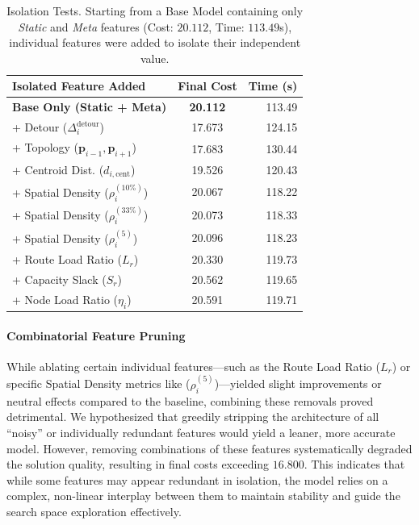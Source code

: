 \documentclass[letterpaper]{article} %
\begin{document}
\begin{table}[h]

\centering

\small

\caption{Isolation Tests. Starting from a Base Model containing only \textit{Static} and \textit{Meta} features (Cost: $20.112$, Time: $113.49$s), individual features were added to isolate their independent value.}
\label{tab:isolation_ablation}
\begin{tabular}{l c r}
\toprule
\textbf{Isolated Feature Added} & \textbf{Final Cost} & \textbf{Time (s)} \\
\midrule
\textbf{Base Only (Static + Meta)} & \textbf{20.112} & 113.49 \\
\midrule
+ Detour ($\Delta^{\text{detour}}_i$) & 17.673 & 124.15 \\
+ Topology ($\mathbf{p}_{i-1}, \mathbf{p}_{i+1}$) & 17.683 & 130.44 \\
+ Centroid Dist. ($d_{i, \text{cent}}$) & 19.526 & 120.43 \\
+ Spatial Density ($\rho^{(10\%)}_i$) & 20.067 & 118.22 \\
+ Spatial Density ($\rho^{(33\%)}_i$) & 20.073 & 118.33 \\
+ Spatial Density ($\rho^{(5)}_i$) & 20.096 & 118.23 \\
+ Route Load Ratio ($L_r$) & 20.330 & 119.73 \\
+ Capacity Slack ($S_r$) & 20.562 & 119.65 \\
+ Node Load Ratio ($\eta_i$) & 20.591 & 119.71 \\
\bottomrule
\end{tabular}
\end{table}

\paragraph{Combinatorial Feature Pruning}
While ablating certain individual features---such as the Route Load Ratio ($L_r$) or specific Spatial Density metrics like ($\rho^{(5)}_i$)---yielded slight improvements or neutral effects compared to the baseline, combining these removals proved detrimental. We hypothesized that greedily stripping the architecture of all ``noisy'' or individually redundant features would yield a leaner, more accurate model. However, removing combinations of these features systematically degraded the solution quality, resulting in final costs exceeding $16.800$. This indicates that while some features may appear redundant in isolation, the model relies on a complex, non-linear interplay between them to maintain stability and guide the search space exploration effectively.
\end{document}
